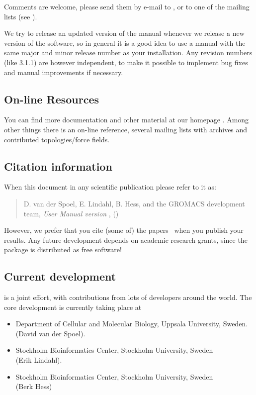 \documentclass[11pt,a4paper,twoside]{gmxmanual}
\begin{document}
{Comments are welcome, please send them by e-mail to {\email}, or to
one of the mailing lists (see \wwwpage).

We try to release an updated version of the manual whenever
we release a new version of the software, so in general 
it is a good idea to use a manual with the same major and
minor release number as your {\gromacs} installation. 
Any revision numbers (like 3.1.1) are however independent, 
to make it possible to implement bug fixes and manual
improvements if necessary. 

\subsection*{On-line Resources}
You can find more documentation and other material at our homepage
\wwwpage. Among other things there is an on-line reference, several
{\gromacs} mailing lists with archives and contributed
topologies/force fields.

\subsection*{Citation information}
When  this document in any scientific publication
please refer to it as:
\begin{quote}
\raggedright
D. van der Spoel, E. Lindahl, B. Hess, and the GROMACS development team,
\hspace{0.3em} {\em {\gromacs} {U}ser {M}anual version \gmxver},
\hspace{0.3em} {\wwwpage} ({\gmxyear})
\end{quote}
However, we prefer that you cite (some of) the {\gromacs}
papers~\cite{Bekker93a,Berendsen95a,Lindahl2001a,Spoel2005a,Hess2008b} when you publish
your results. Any future development depends on academic research
grants, since the package is distributed as free software!

\subsection*{Current development}
{\gromacs} is a joint effort, with contributions from lots of developers around
the world. The core development is currently taking place at
\begin{itemize}
\item Department of Cellular and Molecular Biology, Uppsala University, Sweden.\\ 
(David van der Spoel).
\item Stockholm Bioinformatics Center, Stockholm University, Sweden \\
(Erik Lindahl).
\item Stockholm Bioinformatics Center, Stockholm University, Sweden \\
(Berk Hess)
\end{itemize}

}
\end{document}
